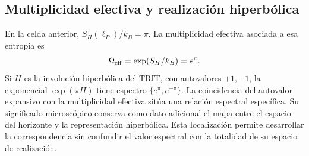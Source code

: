 \subsection{Multiplicidad efectiva y realización hiperbólica}

En la celda anterior, \(S_H(\ell_P)/k_B=\pi\). La multiplicidad
efectiva asociada a esa entropía es
\[
 \Omega_{\rm eff}=\exp(S_H/k_B)=e^\pi.
\]
Si \(H\) es la involución hiperbólica del TRIT, con autovalores
\(+1,-1\), la exponencial \(\exp(\pi H)\) tiene espectro
\(\{e^\pi,e^{-\pi}\}\). La coincidencia del autovalor expansivo
con la multiplicidad efectiva sitúa una relación espectral específica.
Su significado microscópico conserva como dato adicional el mapa entre
el espacio del horizonte y la representación hiperbólica. Esta
localización permite desarrollar la correspondencia sin confundir
el valor espectral con la totalidad de su espacio de realización.
